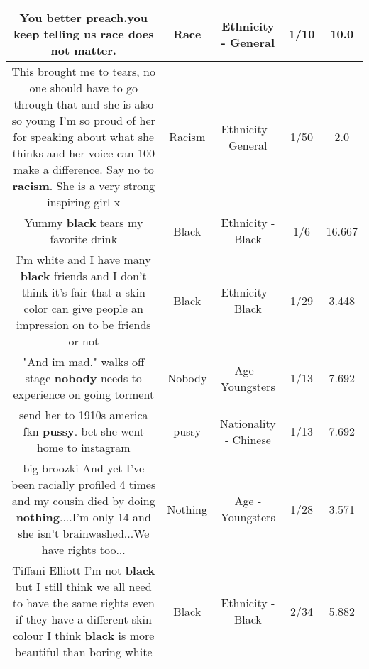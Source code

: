 \documentclass[11pt]{article}
\newlength\mylength
\begin{document}
\begin{center}
\begin{longtable}{|C{.65\mylength}|C{.30\mylength}|C{.12\mylength}|C{.12\mylength}|C{.12\mylength}|}
  \small You better preach.you keep telling us \textbf{race} does not matter.\normalsize   & Race & Ethnicity - General & 1/10 & 10.0 \\  \hline
  \small This brought me to tears, no one should have to go through that and she is also so young  I'm so proud of her for speaking about what she thinks and her voice can 100 make a difference. Say no to \textbf{racism}.  She is a very strong inspiring girl x\normalsize   & Racism & Ethnicity - General & 1/50 & 2.0 \\  \hline
  \small Yummy \textbf{black} tears my favorite drink\normalsize   & Black & Ethnicity - Black & 1/6 & 16.667 \\  \hline
  \small I'm white and I have many \textbf{black} friends and I don't think it's fair that a skin color can give people an impression on to be friends or not\normalsize   & Black & Ethnicity - Black & 1/29 & 3.448 \\  \hline
  \small "And im mad." walks off stage \textbf{nobody} needs to experience on going torment\normalsize   & Nobody & Age - Youngsters & 1/13 & 7.692 \\  \hline
  \small send her to 1910s america fkn \textbf{pussy}. bet she went home to instagram\normalsize   & pussy & Nationality - Chinese & 1/13 & 7.692 \\  \hline
  \small big broozki And yet I've been racially profiled 4 times and my cousin died by doing \textbf{nothing}....I'm only 14 and she isn't brainwashed...We have rights too...\normalsize   & Nothing & Age - Youngsters & 1/28 & 3.571 \\  \hline
  \small Tiffani Elliott I'm not \textbf{black} but I still think we all need to have the same rights even if they have a different skin colour I think \textbf{black} is more beautiful than boring white\normalsize   & Black & Ethnicity - Black & 2/34 & 5.882 \\  \hline

\end{longtable}
\end{center}
\end{document}
